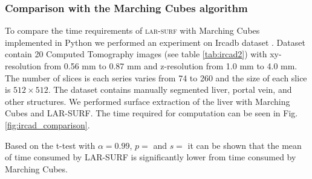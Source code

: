\subsubsection*{Comparison with the Marching Cubes algorithm}
To compare the time requirements of \textsc{lar-surf} with Marching Cubes implemented in Python we performed an experiment on Ircadb dataset \cite{ircadb}. Dataset contain 20 Computed Tomography images (see table \ref{tab:ircad2}) with xy-resolution from 0.56 mm to 0.87 mm and z-resolution from 1.0 mm to 4.0 mm. 
The number of slices is each series varies from 74 to 260 and the size of each slice is $512\times512$. 
The dataset contains manually segmented liver, portal vein, and other structures. We performed surface extraction of the liver with Marching Cubes and LAR-SURF. The time required for computation can be seen in Fig. \ref{fig:ircad_comparison}. 

Based on the t-test with $\alpha=0.99$, $p=$ and 
$s=$ it can be shown that the mean of time consumed by LAR-SURF is significantly lower from time consumed by Marching Cubes.



